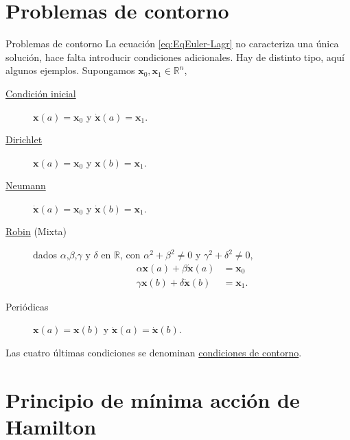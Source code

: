 \documentclass[handout,hyperref={colorlinks=true}]{beamer}
\newcommand{\rr}{\mathbb{R}}
\renewcommand{\b}[1]{\boldsymbol{#1}}
\begin{document}
\section{Problemas de contorno}
\begin{frame}{Problemas de contorno}
La ecuación \eqref{eq:EqEuler-Lagr} no caracteriza una única solución, hace falta introducir condiciones adicionales. Hay de distinto tipo, aquí algunos ejemplos. Supongamos $\b{x}_0,\b{x}_1\in\rr^n$,

\begin{description}

\item[\href{https://en.wikipedia.org/wiki/Initial_value_problem}{Condición inicial}] $\b{x}(a)=\b{x}_0$ y $\b{\dot{x}}(a)=\b{x}_1$. 

\item[\href{https://es.wikipedia.org/wiki/Condici\%C3\%B3n_de_frontera_de_Dirichlet}{Dirichlet}] $\b{x}(a)=\b{x}_0$ y $\b{x}(b)=\b{x}_1$. 

\item[\href{https://es.wikipedia.org/wiki/Condici\%C3\%B3n_de_frontera_de_Neumann}{Neumann}] $\b{\dot{x}}(a)=\b{x}_0$ y $\b{\dot{x}}(b)=\b{x}_1$. 

\item[\href{https://es.wikipedia.org/wiki/Condici\%C3\%B3n_de_frontera_de_Robin}{Robin} (Mixta)] dados $\alpha$,$\beta$,$\gamma$ y $\delta$ en $\rr$, con $\alpha^2+\beta^2\neq 0$ y $\gamma^2+\delta^2\neq 0$,
\[\begin{array}{cc}
\alpha\b{x}(a)+\beta\b{\dot{x}}(a)&=\b{x}_0\\
\gamma\b{x}(b)+\delta\b{\dot{x}}(b)&=\b{x}_1.
  \end{array}
\]
\item[Periódicas] $\b{x}(a)=\b{x}(b)$ y $\b{\dot{x}}(a)=\b{\dot{x}}(b)$.
\end{description}
Las cuatro últimas condiciones se denominan \href{https://es.wikipedia.org/wiki/Problema_de_condici\%C3\%B3n_de_frontera}{condiciones de contorno}.
\end{frame}

\section{Principio de mínima acción de Hamilton}
\end{document}
